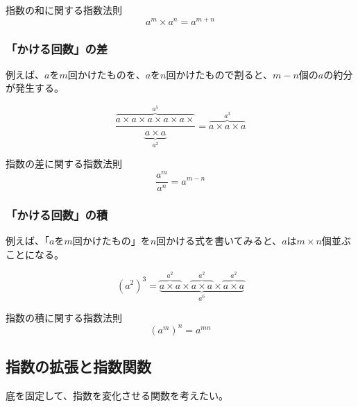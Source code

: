 \documentclass[../math-imaging]{subfiles}
\begin{document}
\begin{theorem}{指数の和に関する指数法則}
  \LARGE
  \begin{equation}
    a^m \times a^n = a^{m+n}
  \end{equation}
\end{theorem}

\subsubsection{「かける回数」の差}

例えば、$a$を$m$回かけたものを、$a$を$n$回かけたもので割ると、$m-n$個の$a$の約分が発生する。

\begin{equation}
  \dfrac{\overbrace{a\times a\times a\times a\times a\times}^{a^5}}{\underbrace{a\times a}_{a^2}} = \overbrace{a\times a\times a}^{a^3}
\end{equation}

\begin{theorem}{指数の差に関する指数法則}
  \LARGE
  \begin{equation}
    \dfrac{a^m}{a^n} = a^{m-n}
  \end{equation}
\end{theorem}

\subsubsection{「かける回数」の積}

例えば、「$a$を$m$回かけたもの」を$n$回かける式を書いてみると、$a$は$m \times n$個並ぶことになる。

\begin{equation}
  (a^2)^3 = \underbrace{\overbrace{a\times a}^{a^2} \times \overbrace{a\times a}^{a^2} \times \overbrace{a\times a}^{a^2}}_{a^6}
\end{equation}

\begin{theorem}{指数の積に関する指数法則}
  \LARGE
  \begin{equation}
    (a^m)^n = a^{mn}
  \end{equation}
\end{theorem}

\subsection{指数の拡張と指数関数}

底を固定して、指数を変化させる関数を考えたい。
\end{document}
